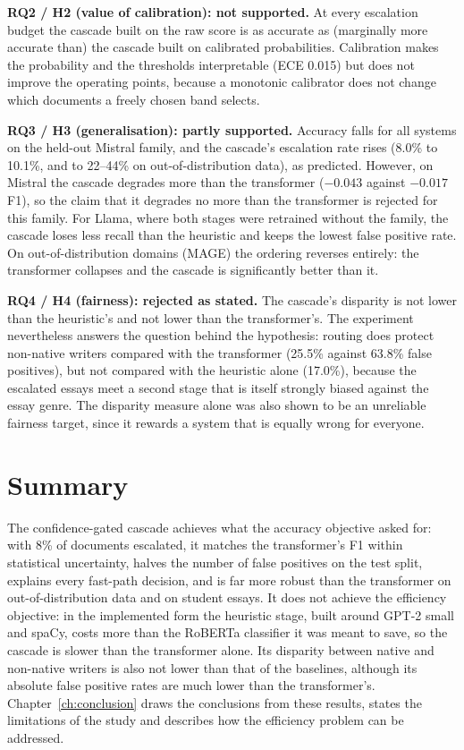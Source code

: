 \textbf{RQ2 / H2 (value of calibration): not supported.} At every escalation
budget the cascade built on the raw score is as accurate as (marginally more
accurate than) the cascade built on calibrated probabilities. Calibration
makes the probability and the thresholds interpretable (ECE 0.015) but does not
improve the operating points, because a monotonic calibrator does not change
which documents a freely chosen band selects.

\textbf{RQ3 / H3 (generalisation): partly supported.} Accuracy falls for all
systems on the held-out Mistral family, and the cascade's escalation rate rises
(8.0\% to 10.1\%, and to 22--44\% on out-of-distribution data), as predicted.
However, on Mistral the cascade degrades more than the transformer
($-0.043$ against $-0.017$ F1), so the claim that it degrades no more than the
transformer is rejected for this family. For Llama, where both stages were
retrained without the family, the cascade loses less recall than the heuristic
and keeps the lowest false positive rate. On out-of-distribution domains (MAGE)
the ordering reverses entirely: the transformer collapses and the cascade is
significantly better than it.

\textbf{RQ4 / H4 (fairness): rejected as stated.} The cascade's disparity is not
lower than the heuristic's and not lower than the transformer's. The
experiment nevertheless answers the question behind the hypothesis: routing
does protect non-native writers compared with the transformer (25.5\% against
63.8\% false positives), but not compared with the heuristic alone (17.0\%),
because the escalated essays meet a second stage that is itself strongly biased
against the essay genre. The disparity measure alone was also shown to be an
unreliable fairness target, since it rewards a system that is equally wrong for
everyone.

\section{Summary}

The confidence-gated cascade achieves what the accuracy objective asked for:
with 8\% of documents escalated, it matches the transformer's F1 within
statistical uncertainty, halves the number of false positives on the test
split, explains every fast-path decision, and is far more robust than the
transformer on out-of-distribution data and on student essays. It does not
achieve the efficiency objective: in the implemented form the heuristic stage,
built around GPT-2 small and spaCy, costs more than the RoBERTa classifier it
was meant to save, so the cascade is slower than the transformer alone. Its
disparity between native and non-native writers is also not lower than that of
the baselines, although its absolute false positive rates are much lower than
the transformer's. Chapter~\ref{ch:conclusion} draws the conclusions from these
results, states the limitations of the study and describes how the efficiency
problem can be addressed.
